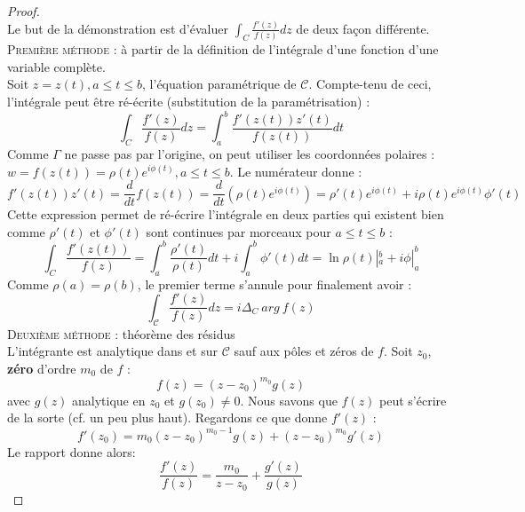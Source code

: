 \begin{proof}\ \\
Le but de la démonstration est d'évaluer $\int_C \frac{f'(z)}{f(z)}dz$ de deux façon différente.\\
\textsc{Première méthode :} à partir de la définition de l'intégrale d'une fonction d'une
variable complète.\\
Soit $z=z(t), a\leq t\leq b$, l'équation paramétrique de $\mathcal{C}$. Compte-tenu de
ceci, l'intégrale peut \^etre ré-écrite (substitution de la paramétrisation) :
\begin{equation}
\int_C\frac{f'(z)}{f(z)}dz = \int_a^b \frac{f'(z(t))z'(t)}{f(z(t))}dt
\end{equation}
Comme $\Gamma$ ne passe pas par l'origine, on peut utiliser les coordonnées polaires :
$w = f(z(t)) = \rho(t)e^{i\phi(t)}, a\leq t\leq b$. Le numérateur donne :
\begin{equation}
f'(z(t))z'(t) = \frac{d}{dt}f(z(t)) = \frac{d}{dt}(\rho(t)e^{i\phi(t)}) = \rho'(t)e^{i
\phi(t)} + i\rho(t)e^{i\phi(t)}\phi'(t)
\end{equation}
Cette expression permet de ré-écrire l'intégrale en deux parties qui existent bien comme 
$\rho'(t)$ et $\phi'(t)$ sont continues par morceaux pour $a\leq t \leq b$ :
\begin{equation}
\int_C\frac{f'(z(t))}{f(z)} = \int_a^b \frac{\rho'(t)}{\rho(t)}dt + i\int_a^b \phi'(t)dt
= \ln\rho(t)|_a^b + i\phi|_a^b
\end{equation}
Comme $\rho(a)=\rho(b)$, le premier terme s'annule pour finalement avoir :
\begin{equation}
\int_\mathcal{C} \frac{f'(z)}{f(z)}dz = i\Delta_C\ arg\ f(z)
\end{equation}
\textsc{Deuxième méthode} : théorème des résidus\\
L'intégrante est analytique dans et sur $\mathcal{C}$ sauf aux pôles et zéros de $f$. Soit
$z_0$, \textbf{zéro} d'ordre $m_0$ de $f$ :
\begin{equation}
f(z) = (z-z_0)^{m_0}g(z)
\end{equation}
avec $g(z)$ analytique en $z_0$ et $g(z_0)\neq0$. Nous savons que $f(z)$ peut s'écrire de 
la sorte (cf. un peu plus haut). Regardons ce que donne $f'(z)$ :
\begin{equation}
f'(z_0) =  m_0(z-z_0)^{m_0-1}g(z) + (z-z_0)^{m_0}g'(z)
\end{equation}
Le rapport donne alors:
\begin{equation}
\frac{f'(z)}{f(z)} = \frac{m_0}{z-z_0}+\frac{g'(z)}{g(z)}

\end{equation}
\end{proof}
